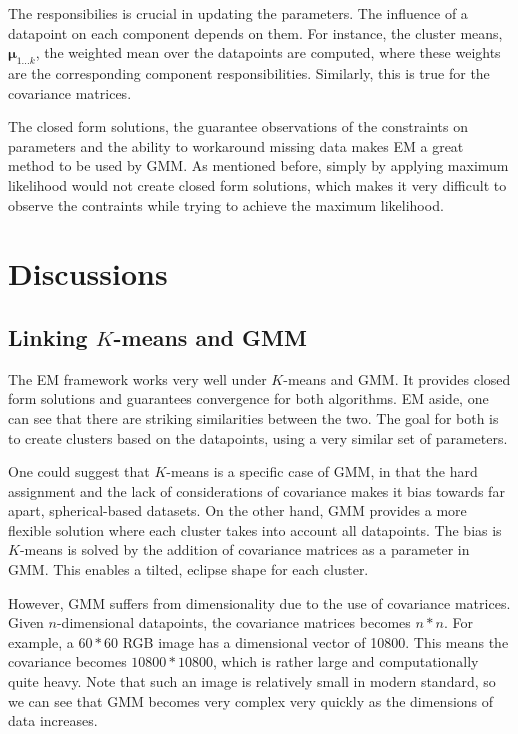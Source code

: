 \documentclass[11pt,openright,a4paper]{article}
\numberwithin{equation}{section}
\begin{document}
The responsibilies is crucial in updating the parameters. The influence of a datapoint on each component depends on them. For instance, the cluster means, $\boldsymbol\mu_{1...k}$, the weighted mean over the datapoints are computed, where these weights are the corresponding component responsibilities. Similarly, this is true for the covariance matrices.

The closed form solutions, the guarantee observations of the constraints on parameters and the ability to workaround missing data makes EM a great method to be used by GMM. As mentioned before, simply by applying maximum likelihood would not create closed form solutions, which makes it very difficult to observe the contraints while trying to achieve the maximum likelihood.

\newpage
\section{Discussions} \label{sec:dis}
\subsection{Linking $K$-means and GMM} \label{ssec:dis-link}
The EM framework works very well under $K$-means and GMM. It provides closed form solutions and guarantees convergence for both algorithms. EM aside, one can see that there are striking similarities between the two. The goal for both is to create clusters based on the datapoints, using a very similar set of parameters.

One could suggest that $K$-means is a specific case of GMM, in that the hard assignment and the lack of considerations of covariance makes it bias towards far apart, spherical-based datasets. On the other hand, GMM provides a more flexible solution where each cluster takes into account all datapoints. The bias is $K$-means is solved by the addition of covariance matrices as a parameter in GMM. This enables a tilted, eclipse shape for each cluster.

However, GMM suffers from dimensionality due to the use of covariance matrices. Given $n$-dimensional datapoints, the covariance matrices becomes $n*n$. For example, a $60*60$ RGB image has a dimensional vector of 10800. This means the covariance becomes $10800 * 10800$, which is rather large and computationally quite heavy. Note that such an image is relatively small in modern standard, so we can see that GMM becomes very complex very quickly as the dimensions of data increases.
\end{document}
